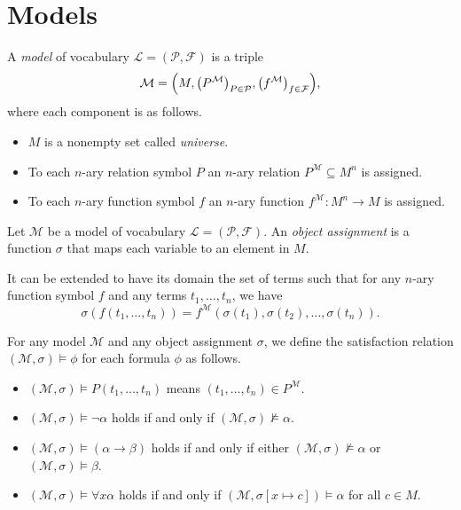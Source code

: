 \section{Models}
\begin{definition}
  A \emph{model} of vocabulary $\mathcal{L} = (\mathcal{P}, \mathcal{F})$
  is a triple
  \begin{equation*}
    \mathcal{M} =
    \Bigl(
      M,
      \bigl(P^\mathcal{M}\bigr)_{P \in \mathcal{P}},
      \bigl(f^\mathcal{M}\bigr)_{f \in \mathcal{F}}
    \Bigr),
  \end{equation*}
  where each component is as follows.
  \begin{itemize}
    \item $M$ is a nonempty set called \emph{universe}.
    \item To each $n$-ary relation symbol $P$ an $n$-ary relation
    $P^\mathcal{M} \subseteq M^n$ is assigned.
    \item To each $n$-ary function symbol $f$ an $n$-ary function
    $f^\mathcal{M}: M^n \to M$ is assigned.
  \end{itemize}
\end{definition}

\begin{definition}
  Let $\mathcal{M}$ be a model of vocabulary $\mathcal{L} = (\mathcal{P},
  \mathcal{F})$.
  An \emph{object assignment} is a function $\sigma$ that maps each variable to
  an element in $M$.

  It can be extended to have its domain the set of terms such that for any
  $n$-ary function symbol $f$ and any terms $t_1, \dots, t_n$, we have
  \begin{equation*}
    \sigma(f(t_1, \dots, t_n))
    = f^\mathcal{M}(\sigma(t_1), \sigma(t_2), \dots, \sigma(t_n)).
  \end{equation*}
\end{definition}

\begin{definition}
  For any model $\mathcal{M}$ and any object assignment $\sigma$, we define
  the satisfaction relation $(\mathcal{M}, \sigma) \vDash \phi$ for each
  formula $\phi$ as follows.
  \begin{itemize}
    \item $(\mathcal{M}, \sigma) \vDash P(t_1, \dots, t_n)$ means
    $(t_1, \dots, t_n) \in P^\mathcal{M}$.
    \item $(\mathcal{M}, \sigma) \vDash \neg\alpha$ holds if and only if
    $(\mathcal{M}, \sigma) \nvDash \alpha$.
    \item $(\mathcal{M}, \sigma) \vDash (\alpha \to \beta)$ holds if and only
    if either $(\mathcal{M}, \sigma) \nvDash \alpha$ or
    $(\mathcal{M}, \sigma) \vDash \beta$.
    \item $(\mathcal{M}, \sigma) \vDash \forall x \alpha$ holds if and only if
    $(\mathcal{M}, \sigma[x \mapsto c]) \vDash \alpha$ for all $c \in M$.
  \end{itemize}
\end{definition}